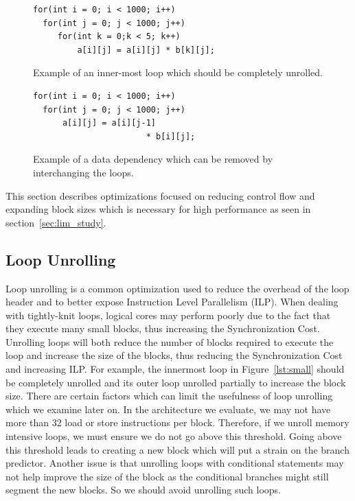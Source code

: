 \begin{figure}[t]
\begin{minipage}[t]{0.48\textwidth}
\lstset{language=C,numbersep=4pt,basicstyle=\small}
\begin{lstlisting}
for(int i = 0; i < 1000; i++)
  for(int j = 0; j < 1000; j++)
     for(int k = 0;k < 5; k++)
         a[i][j] = a[i][j] * b[k][j];
\end{lstlisting}
\vspace*{-5mm}
\caption{Example of an inner-most loop which should be completely unrolled.}
\label{lst:small}
\end{minipage}
\hfill
\begin{minipage}[t]{0.48\textwidth}
\lstset{language=C,numbersep=4pt,basicstyle=\small}
\begin{lstlisting}
for(int i = 0; i < 1000; i++)
  for(int j = 0; j < 1000; j++)
      a[i][j] = a[i][j-1] 
                       * b[i][j];
\end{lstlisting}
\vspace*{-5mm}
\caption{Example of a data dependency which can be removed by interchanging the loops.}
\label{lst:dep}
\end{minipage}
\vspace{9mm}
\end{figure}

This section describes optimizations focused on reducing control flow and expanding block sizes which is necessary for high performance as seen in section~\ref{sec:lim_study}.

\subsection{Loop Unrolling}
Loop unrolling is a common optimization used to reduce the overhead of the loop header and to better expose Instruction Level Parallelism (ILP).
When dealing with tightly-knit loops, logical cores may perform poorly due to the fact that they execute many small blocks, thus increasing the Synchronization Cost.
Unrolling loops will both reduce the number of blocks required to execute the loop and increase the size of the blocks, thus reducing the Synchronization Cost and increasing ILP.
For example, the innermost loop in Figure~\ref{lst:small} should be completely unrolled and its outer loop unrolled partially to increase the block size.
There are certain factors which can limit the usefulness of loop unrolling which we examine later on.
In the architecture we evaluate, we may not have more than 32 load or store instructions per block.
Therefore, if we unroll memory intensive loops, we must ensure we do not go above this threshold.
Going above this threshold leads to creating a new block which will put a strain on the branch predictor.
Another issue is that unrolling loops with conditional statements may not help improve the size of the block as the conditional branches might still segment the new blocks.
So we should avoid unrolling such loops.




